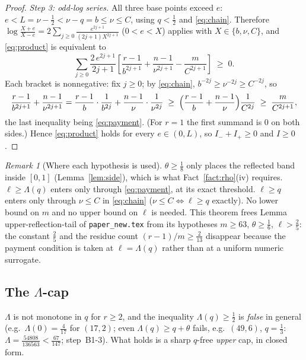 \documentclass[11pt]{article}
\theoremstyle{remark}
\newtheorem{remark}[theorem]{Remark}
\theoremstyle{plain}
\theoremstyle{plain}
\begin{document}
\begin{proof}
\emph{Step 3: odd-log series.}  All three base points exceed $e$: $e<L=\nu-\tfrac12<\nu-q=b\le\nu\le C$, using $q<\tfrac12$ and \eqref{eq:chain}.  Therefore
$\log\frac{X+e}{X-e}=2\sum_{j\ge0}\frac{e^{2j+1}}{(2j+1)X^{2j+1}}$ ($0<e<X$) applies with $X\in\{b,\nu,C\}$, and \eqref{eq:product} is equivalent to
\[
        \sum_{j\ge0}\frac{2\,e^{2j+1}}{2j+1}
        \left[\frac{r-1}{b^{2j+1}}+\frac{n-1}{\nu^{2j+1}}-\frac{m}{C^{2j+1}}\right]
        \;\ge\;0 .
\]
Each bracket is nonnegative: fix $j\ge0$; by \eqref{eq:chain}, $b^{-2j}\ge\nu^{-2j}\ge C^{-2j}$, so
\[
        \frac{r-1}{b^{2j+1}}+\frac{n-1}{\nu^{2j+1}}
        =\frac{r-1}{b}\cdot\frac1{b^{2j}}+\frac{n-1}{\nu}\cdot\frac1{\nu^{2j}}
        \;\ge\;
        \Bigl(\frac{r-1}{b}+\frac{n-1}{\nu}\Bigr)\frac1{C^{2j}}
        \;\ge\;\frac{m}{C^{2j+1}},
\]
the last inequality being \eqref{eq:payment}.  (For $r=1$ the first summand is $0$ on both sides.)  Hence \eqref{eq:product} holds for every $e\in(0,L)$, so $I_-+I_+\ge0$ and $I\ge0$.
\end{proof}

\begin{remark}[Where each hypothesis is used]
$\theta\ge\tfrac18$ only places the reflected band inside $[0,1]$ (Lemma~\ref{lem:side}), which is what Fact~\ref{fact:rho}(iv) requires.  $\ell\ge\Lambda(q)$ enters only through \eqref{eq:payment}, at its exact threshold.  $\ell\ge q$ enters only through $\nu\le C$ in \eqref{eq:chain} ($\nu\le C\iff\ell\ge q$ exactly).  No lower bound on $m$ and no upper bound on $\ell$ is needed.  This theorem frees Lemma upper-reflection-tail of \texttt{paper\_new.tex} from its hypotheses $m\ge63$, $\theta\ge\tfrac16$, $\ell>\tfrac25$: the constant $\tfrac25$ and the residue count $(r-1)/m\ge\tfrac2{13}$ disappear because the payment condition is taken at $\ell=\Lambda(q)$ rather than at a uniform numeric surrogate.
\end{remark}

\subsection{The $\Lambda$-cap}\label{sec:cap}

$\Lambda$ is not monotone in $q$ for $r\ge2$, and the inequality $\Lambda(q)\ge\tfrac12$ is \emph{false} in general (e.g.\ $\Lambda(0)=\tfrac4{17}$ for $(17,2)$; even $\Lambda(q)\ge q+\theta$ fails, e.g.\ $(49,6)$, $q=\tfrac13$: $\Lambda=\tfrac{54808}{136563}<\tfrac{67}{147}$; step~B1-3).  What holds is a sharp $q$-free \emph{upper} cap, in closed form.
\end{document}

